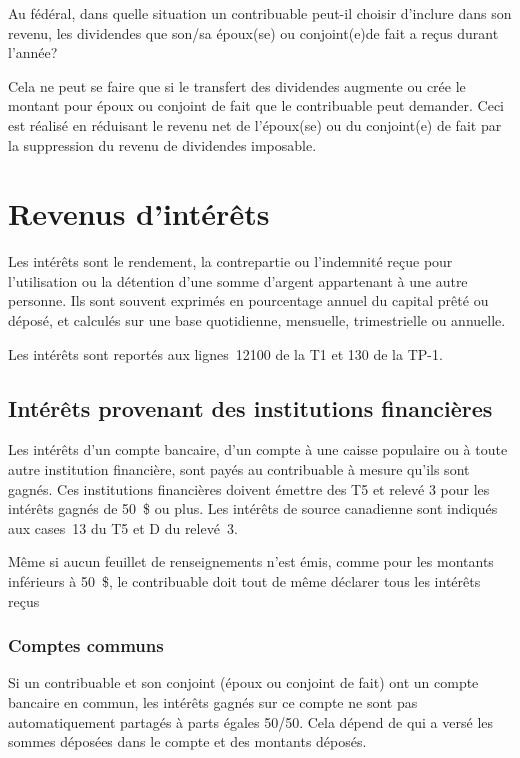 \begin{question}
	Au fédéral, dans quelle situation un contribuable peut-il choisir d'inclure dans son revenu, les dividendes que son/sa époux(se) ou conjoint(e)de fait a reçus durant l'année?
\end{question}
Cela ne peut se faire que si le transfert des dividendes augmente ou crée le montant pour époux ou conjoint de fait que le contribuable peut demander. Ceci est réalisé en réduisant le revenu net de l'époux(se) ou du conjoint(e) de fait par la suppression du revenu de dividendes imposable.



\section{Revenus d'intérêts}
\begin{intro}
	Les intérêts sont le rendement, la contrepartie ou l'indemnité reçue pour l'utilisation ou la détention d'une somme d'argent appartenant à une autre personne. Ils sont souvent exprimés en pourcentage annuel du capital prêté ou déposé, et calculés sur une base quotidienne, mensuelle, trimestrielle ou annuelle.
\end{intro}
Les intérêts sont reportés aux lignes~12100 de la T1 et 130 de la TP-1.


\subsection{Intérêts provenant des institutions financières}
Les intérêts d'un compte bancaire, d'un compte à une caisse populaire ou à toute autre institution financière, sont payés au contribuable à mesure qu'ils sont gagnés. Ces institutions financières doivent émettre des T5 et relevé 3 pour les intérêts gagnés de 50~\$ ou plus. Les intérêts de source canadienne sont indiqués aux cases~13 du T5 et D du relevé~3. 

Même si aucun feuillet de renseignements n'est émis, comme pour les montants inférieurs à 50~\$, le contribuable doit tout de même déclarer tous les intérêts reçus


\subsubsection{Comptes communs}
Si un contribuable et son conjoint (époux ou conjoint de fait) ont un compte bancaire en commun, les intérêts gagnés sur ce compte ne sont pas automatiquement partagés à parts égales 50/50. Cela dépend de qui a versé les sommes déposées dans le compte et des montants déposés.


